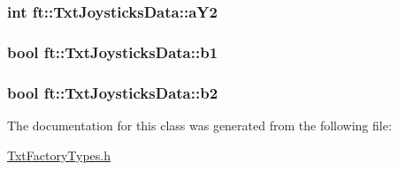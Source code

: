 \subsubsection[{\texorpdfstring{a\+Y2}{aY2}}]{\setlength{\rightskip}{0pt plus 5cm}int ft\+::\+Txt\+Joysticks\+Data\+::a\+Y2}\hypertarget{classft_1_1_txt_joysticks_data_a1f0f0ab1c9ce007a12b57663343d9e9a}{}\label{classft_1_1_txt_joysticks_data_a1f0f0ab1c9ce007a12b57663343d9e9a}
\subsubsection[{\texorpdfstring{b1}{b1}}]{\setlength{\rightskip}{0pt plus 5cm}bool ft\+::\+Txt\+Joysticks\+Data\+::b1}\hypertarget{classft_1_1_txt_joysticks_data_aeff9b78b9b8164ab6f3c2250afa3c171}{}\label{classft_1_1_txt_joysticks_data_aeff9b78b9b8164ab6f3c2250afa3c171}
\subsubsection[{\texorpdfstring{b2}{b2}}]{\setlength{\rightskip}{0pt plus 5cm}bool ft\+::\+Txt\+Joysticks\+Data\+::b2}\hypertarget{classft_1_1_txt_joysticks_data_a69e694fa165365b2498e592d7cdb17e2}{}\label{classft_1_1_txt_joysticks_data_a69e694fa165365b2498e592d7cdb17e2}


The documentation for this class was generated from the following file\+:\begin{DoxyCompactItemize}
\item 
\hyperlink{_txt_factory_types_8h}{Txt\+Factory\+Types.\+h}\end{DoxyCompactItemize}
